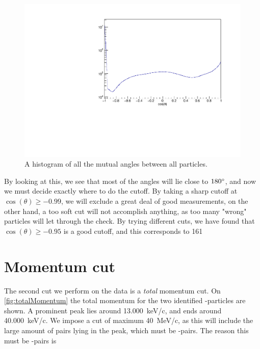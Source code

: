 \begin{figure}[h]
	\centering
	\includegraphics[width=\linewidth]{../figures/cosang.pdf}
	\caption{A histogram of all the mutual angles between all particles.}
	\label{fig:cosAll}
\end{figure}

By looking at this, we see that most of the angles will lie close to $180\degree$, and now we must decide exactly where to do the cutoff. 
By taking a sharp cutoff at $\cos(\theta) \geq -0.99$, we will exclude a great deal of good measurements, on the other hand, a too soft cut will not accomplish anything, as too many "wrong" particles will let through the check. By trying different cuts, we have found that $\cos(\theta) \geq -0.95$ is a good cutoff, and this corresponds to 161\degree



\section{Momentum cut}
The second cut we perform on the data is a \textit{total} momentum cut. On \cref{fig:totalMomentum} the total momentum for the two identified \al-particles are shown. 
A prominent peak lies around \SI{13.000}{keV/c}, and ends around \SI{40.000 }{keV/c}. 
We impose a cut of maximum \SI{40}{MeV/c}, as this will include the large amount of pairs lying in the peak, which must be \al-\al pairs. The reason this must be \al-\al pairs is 


